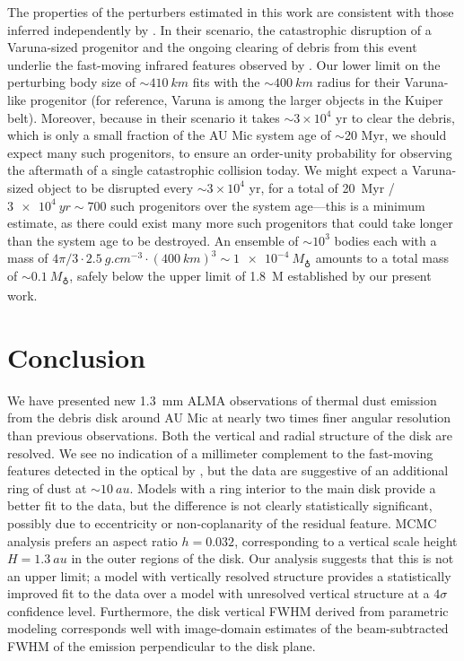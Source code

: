 \documentclass[modern]{aastex62}
\begin{document}
The properties of the perturbers estimated in this work are consistent with those inferred independently by \citet{chiang&fung17}.  
In their scenario, the catastrophic disruption of a Varuna-sized progenitor and the ongoing clearing of debris from this event underlie the fast-moving infrared features observed by \citet{boccaletti15,boccaletti18}.  
Our lower limit on the perturbing body size of $\sim \SI{410}{km}$ fits with the $\sim \SI{400}{km}$ radius for their Varuna-like progenitor (for reference, Varuna is among the larger objects in the Kuiper belt).  
Moreover, because in their scenario it takes $\sim$$3\times 10^4$ yr to clear the debris, which is only a small fraction of the AU Mic system age of $\sim$20 Myr, we should expect many such progenitors, to ensure an order-unity probability for observing the aftermath of a single catastrophic collision today.  
We might expect a Varuna-sized object to be disrupted every $\sim$$3\times 10^4$ yr, for a total of \SI{20}{Myr} / $ \SI{3e4}{yr} \sim 700$ such progenitors over the system age---this is a minimum estimate, as there could exist many more such progenitors that could take longer than the system age to be destroyed.  
An ensemble of $\sim 10^3$ bodies each with a mass of $4\pi/3 \cdot \SI{2.5}{g.cm^{-3}} \cdot (\SI{400}{km})^3 \sim \SI{1e-4}{M_\earth}$ amounts to a total mass of $\sim \SI{0.1}{M_\earth}$, safely below the upper limit of \SI{1.8}{M_\earth} established by our present work.

\section{Conclusion}
\label{section: conclusion}

We have presented new \SI{1.3}{mm} ALMA observations of thermal dust
emission from the debris disk around AU Mic at nearly two times finer angular resolution than previous observations. 
Both the vertical and radial structure of the disk are resolved.
We see no indication of a millimeter complement to the fast-moving features detected in the optical by \citet{boccaletti15}, but the data are suggestive of an additional ring of dust at $\sim \SI{10}{au}$.
Models with a ring interior to the main disk provide a better fit to the data, but the difference is not clearly statistically significant, possibly due to eccentricity or non-coplanarity of the residual feature.
MCMC analysis prefers an aspect ratio $h = 0.032$, corresponding to a vertical scale height $H = \SI{1.3}{au}$ in the outer regions of the disk.
Our analysis suggests that this is not an upper limit; a model with vertically resolved structure provides a statistically improved fit to the data over a model with unresolved vertical structure at a $4 \sigma$ confidence level.
Furthermore, the disk vertical FWHM derived from parametric modeling corresponds well with image-domain estimates of the beam-subtracted FWHM of the emission perpendicular to the disk plane.
\end{document}
